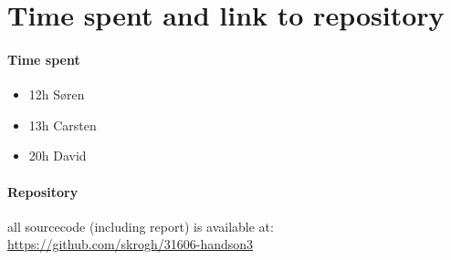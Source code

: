 \section{Time spent and link to repository}

\paragraph{ Time spent }
\begin{itemize}
  \item 12h Søren
  \item 13h Carsten
  \item 20h David
\end{itemize}

\paragraph{ Repository }
all sourcecode (including report) is available at:
\url{ https://github.com/skrogh/31606-handson3 }